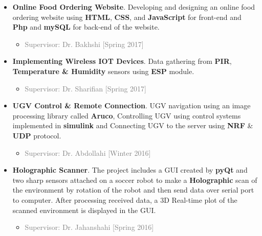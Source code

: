 \documentclass[10pt,a4paper,sans]{moderncv} %
\begin{document}
\begin{itemize}
	

\item \textbf{Online Food Ordering Website}. Developing and designing an online food ordering website using \textbf{HTML}, \textbf{CSS}, and \textbf{JavaScript} for front-end and \textbf{Php} and \textbf{mySQL} for back-end of the website.
\begin{itemize}
	\item \textcolor{gray}{Supervisor: Dr. Bakhshi [Spring 2017]}
	\newline
\end{itemize}

\item \textbf{Implementing Wireless IOT Devices}. Data gathering from \textbf{PIR}, \textbf{Temperature \& Humidity} sensors using \textbf{ESP} module.
\begin{itemize}
	\item \textcolor{gray}{Supervisor: Dr. Sharifian [Spring 2017]}
	\newline
\end{itemize}

\item \textbf{UGV Control \& Remote Connection}. UGV navigation using an image processing library called \textbf{Aruco}, Controlling UGV using control systems implemented in \textbf{simulink} and Connecting UGV to the server using \textbf{NRF} \& \textbf{UDP} protocol.
\begin{itemize}
	\item \textcolor{gray}{Supervisor: Dr. Abdollahi [Winter 2016]}
	\newline
\end{itemize}

\item \textbf{Holographic Scanner}. The project includes a GUI created by \textbf{pyQt} and two sharp sensors attached on a soccer robot to make a \textbf{Holographic} scan of the environment by rotation of the robot and then send data over serial port to computer. After processing received data, a 3D Real-time plot of the scanned environment is displayed in the GUI.
\begin{itemize}
	\item \textcolor{gray}{Supervisor: Dr. Jahanshahi [Spring 2016]}
	\newline
\end{itemize}



\end{itemize}
\end{document}
